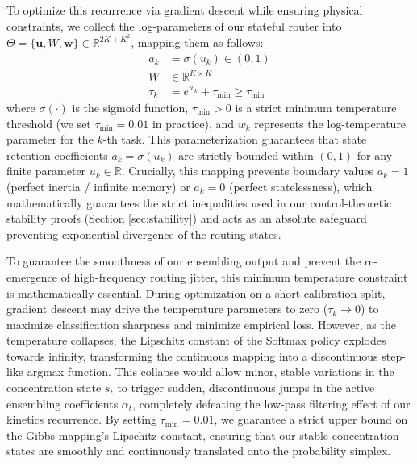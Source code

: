 To optimize this recurrence via gradient descent while ensuring physical constraints, we collect the log-parameters of our stateful router into $\Theta = \{\mathbf{u}, W, \mathbf{w}\} \in \mathbb{R}^{2K + K^2}$, mapping them as follows:
\begin{align}
    a_k &= \sigma(u_k) \in (0, 1) \\
    W &\in \mathbb{R}^{K \times K} \\
    \tau_k &= e^{w_k} + \tau_{\min} \ge \tau_{\min}
\end{align}
where $\sigma(\cdot)$ is the sigmoid function, $\tau_{\min} > 0$ is a strict minimum temperature threshold (we set $\tau_{\min} = 0.01$ in practice), and $w_k$ represents the log-temperature parameter for the $k$-th task. This parameterization guarantees that state retention coefficients $a_k = \sigma(u_k)$ are strictly bounded within $(0, 1)$ for any finite parameter $u_k \in \mathbb{R}$. Crucially, this mapping prevents boundary values $a_k = 1$ (perfect inertia / infinite memory) or $a_k = 0$ (perfect statelessness), which mathematically guarantees the strict inequalities used in our control-theoretic stability proofs (Section \ref{sec:stability}) and acts as an absolute safeguard preventing exponential divergence of the routing states.

To guarantee the smoothness of our ensembling output and prevent the re-emergence of high-frequency routing jitter, this minimum temperature constraint is mathematically essential. During optimization on a short calibration split, gradient descent may drive the temperature parameters to zero ($\tau_k \to 0$) to maximize classification sharpness and minimize empirical loss. However, as the temperature collapses, the Lipschitz constant of the Softmax policy explodes towards infinity, transforming the continuous mapping into a discontinuous step-like argmax function. This collapse would allow minor, stable variations in the concentration state $s_t$ to trigger sudden, discontinuous jumps in the active ensembling coefficients $\alpha_t$, completely defeating the low-pass filtering effect of our kinetics recurrence. By setting $\tau_{\min} = 0.01$, we guarantee a strict upper bound on the Gibbs mapping's Lipschitz constant, ensuring that our stable concentration states are smoothly and continuously translated onto the probability simplex.

